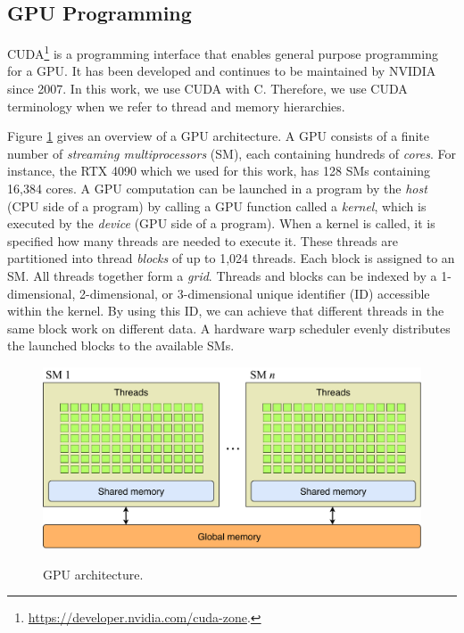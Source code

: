 \documentclass[runningheads]{llncs}
\begin{document}

\subsection{GPU Programming} \label{sec:GPUProgramming}

CUDA\footnote{\url{https://developer.nvidia.com/cuda-zone}.} is a programming interface that enables general purpose programming for a GPU. It has been developed and continues to be maintained by NVIDIA since 2007.  In this work, we use CUDA with C\code{++}. Therefore, we use CUDA terminology when we refer to thread and memory hierarchies. 

Figure \ref{fig:gpu_architecture} gives an overview of a GPU architecture.
A GPU consists of a finite number of \emph{streaming multiprocessors} (SM), each containing hundreds of \emph{cores}. For instance, the RTX 4090 which we used for this work, has 128 SMs containing 16,384 cores. A GPU computation can be launched in a program by the \emph{host} (CPU side of a program) by calling a GPU function called a \emph{kernel}, which is executed by the \emph{device} (GPU side of a program). When a kernel is called, it is specified how many threads are needed to execute it. These threads are partitioned into thread \emph{blocks} of up to 1,024 threads. Each block is assigned to an SM. All threads together form a \emph{grid}. Threads and blocks can be indexed by a 1-dimensional, 2-dimensional, or 3-dimensional unique identifier (ID) accessible within the kernel. By using this ID, we can achieve that different threads in the same block work on different data. A hardware warp scheduler evenly distributes the launched blocks to the available SMs.  

\begin{figure}[t!]
	\centering
	 {
		\includegraphics[width=\textwidth]{architecture.pdf}
	}
	\caption{GPU architecture.}
	\label{fig:gpu_architecture}
\end{figure}
\end{document}
